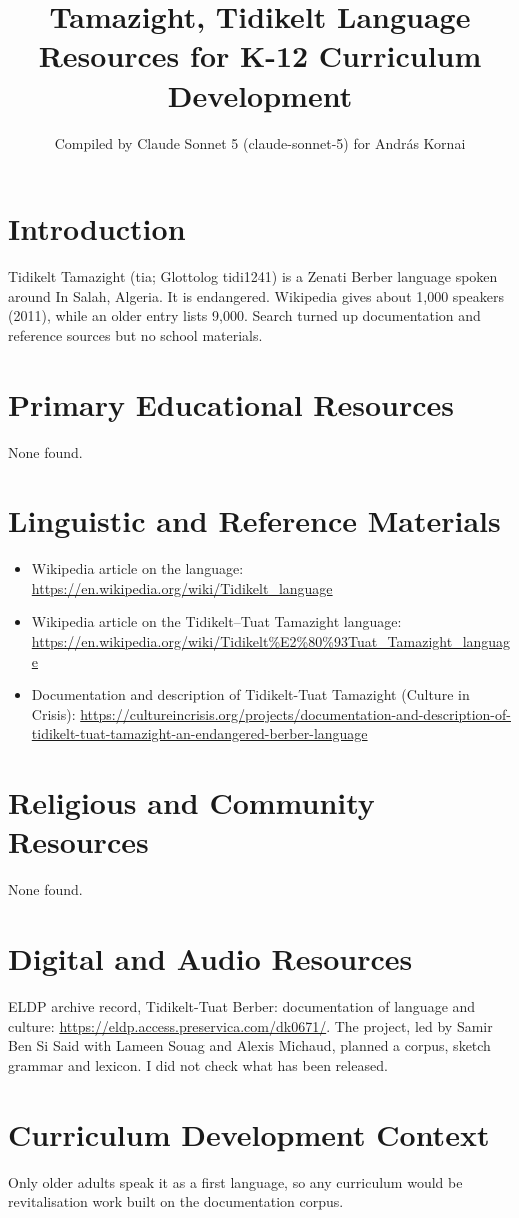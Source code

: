 \documentclass[12pt]{article}
\title{Tamazight, Tidikelt Language Resources for K-12 Curriculum Development}
\author{Compiled by Claude Sonnet 5 (claude-sonnet-5) for Andr\'as Kornai}
\date{}
\begin{document}
\maketitle
\section{Introduction}
Tidikelt Tamazight (tia; Glottolog tidi1241) is a Zenati Berber language spoken around In Salah, Algeria. It is endangered. Wikipedia gives about 1,000 speakers (2011), while an older entry lists 9,000. Search turned up documentation and reference sources but no school materials.
\section{Primary Educational Resources}
None found.
\section{Linguistic and Reference Materials}
\begin{itemize}
\item Wikipedia article on the language: \url{https://en.wikipedia.org/wiki/Tidikelt_language}
\item Wikipedia article on the Tidikelt--Tuat Tamazight language: \url{https://en.wikipedia.org/wiki/Tidikelt%E2%80%93Tuat_Tamazight_language}
\item Documentation and description of Tidikelt-Tuat Tamazight (Culture in Crisis): \url{https://cultureincrisis.org/projects/documentation-and-description-of-tidikelt-tuat-tamazight-an-endangered-berber-language}
\end{itemize}
\section{Religious and Community Resources}
None found.
\section{Digital and Audio Resources}
ELDP archive record, Tidikelt-Tuat Berber: documentation of language and culture: \url{https://eldp.access.preservica.com/dk0671/}. The project, led by Samir Ben Si Said with Lameen Souag and Alexis Michaud, planned a corpus, sketch grammar and lexicon. I did not check what has been released.
\section{Curriculum Development Context}
Only older adults speak it as a first language, so any curriculum would be revitalisation work built on the documentation corpus.
\end{document}
